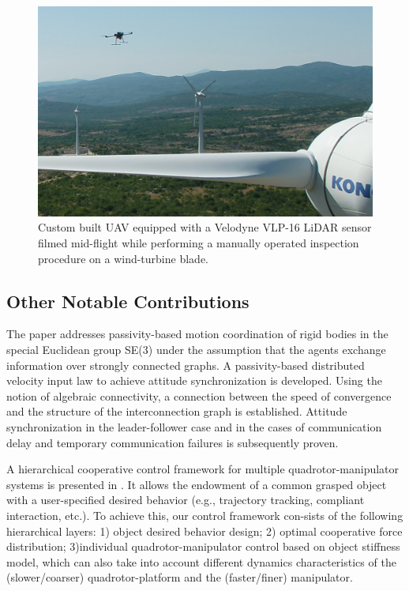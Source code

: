 \begin{figure}[H]
	\centering
	\includegraphics[width=\columnwidth]{./figure/drone_flight3_1.png}
	\caption{Custom built UAV equipped with a Velodyne VLP-16 LiDAR sensor filmed mid-flight  while performing a manually operated inspection procedure on a wind-turbine blade.}
	\label{fig:drone-flight}
\end{figure}


\subsection{Other Notable Contributions}
The paper \cite{passivity-attitude-sync} addresses passivity-based motion coordination of rigid bodies in the special Euclidean group SE(3) under the assumption that the agents exchange information over strongly connected graphs. A passivity-based distributed velocity input law to achieve attitude synchronization is developed. Using the notion of algebraic connectivity, a connection between the speed of convergence and the structure of the interconnection graph is established. Attitude synchronization in the leader-follower case and in the cases of communication delay and temporary communication failures is subsequently proven.

A hierarchical cooperative control framework for multiple quadrotor-manipulator systems is presented in \cite{cooperative-control-quadrotor}. It allows the endowment of a common grasped object with a user-specified desired behavior (e.g., trajectory tracking, compliant interaction, etc.). To achieve  this,  our  control  framework  con-sists  of  the  following  hierarchical  layers: 1) object desired behavior design; 2) optimal cooperative force distribution; 3)individual quadrotor-manipulator control based on object stiffness model, which can also take into account different dynamics characteristics of the (slower/coarser) quadrotor-platform and the (faster/finer) manipulator.

